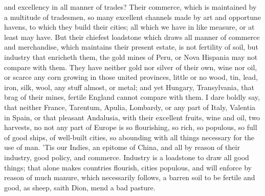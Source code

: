 and excellency in all manner of trades? Their commerce, which is maintained by
a multitude of tradesmen, so many excellent channels made by art and opportune
havens, to which they build their cities; all which we have in like measure, or
at least may have. But their chiefest loadstone which draws all manner of
commerce and merchandise, which maintains their present estate, is not
fertility of soil, but industry that enricheth them, the gold mines of Peru, or
Nova Hispania may not compare with them. They have neither gold nor silver of
their own, wine nor oil, or scarce any corn growing in those united provinces,
little or no wood, tin, lead, iron, silk, wool, any stuff almost, or metal; and
yet Hungary, Transylvania, that brag of their mines, fertile England cannot
compare with them. I dare boldly say, that neither France, Tarentum, Apulia,
Lombardy, or any part of Italy, Valentia in Spain, or that pleasant Andalusia,
with their excellent fruits, wine and oil, two harvests, no not any part of
Europe is so flourishing, so rich, so populous, so full of good ships, of
well-built cities, so abounding with all things necessary for the use of man.
'Tis our Indies, an epitome of China, and all by reason of their industry, good
policy, and commerce. Industry is a loadstone to draw all good things; that
alone makes countries flourish, cities populous, and will
enforce by reason of much manure, which necessarily follows, a barren soil to
be fertile and good, as sheep, saith Dion, mend a bad
pasture.

